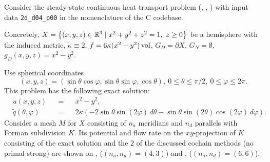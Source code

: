 \begin{example}
  \label{cmc/diffusion/continuous/steady_state/examples/2d_d04_p00-example}
  Consider the steady-state continuous heat transport problem
  (,
   ,
   )
  with input data \verb|2d_d04_p00| in the nomenclature of the C codebase.

  Concretely,
    $X = \left\{ (x, y, z) \in \mathbb{R}^3 \mid x^2 + y^2 + z^2 = 1,\ z \geq 0 \right\}$ be a
      hemisphere with the induced metric,
    $\tilde{\kappa} \equiv 2$,
    $f = 6 \kappa (x^2 - y^2) \mathop{\rm vol}\nolimits$,
    $G_D = \partial X$,
    $G_N = \emptyset$,
    $g_D(x, y, z) = x^2 - y^2$.

  Use spherical coordinates
  \begin{equation}
    (x, y, z)
    = (\sin \theta \cos \varphi, \sin \theta \sin \varphi, \cos \theta),\
    0 \leq \theta \leq \pi / 2,\
    0 \leq \varphi \leq 2 \pi.
  \end{equation}
  This problem has the following exact solution:
  \begin{subequations}
    \begin{alignat}{3}
      & u(x, y, z) && = && x^2 - y^2, \\
      & \tilde{q}(\theta, \varphi) &&
      = && 2 \kappa (- 2 \sin \theta \sin(2 \varphi)\, d \theta
                     - \sin \theta \sin(2 \theta) \cos (2 \varphi)\, d \varphi).
    \end{alignat}
  \end{subequations}
  Consider a mesh $M$ for $X$ consisting of $n_a$ meridians and $n_d$ parallels
  with Forman subdivision $K$.
  Its potential and flow rate on the $xy$-projection of $K$ consisting of the
  exact solution and the $2$ of the discussed cochain methods (no primal strong)
  are shown on
  ,
  ($(n_a, n_d) = (4, 3)$)
  and
  ,
  ($(n_a, n_d) = (6, 6)$).
\end{example}

